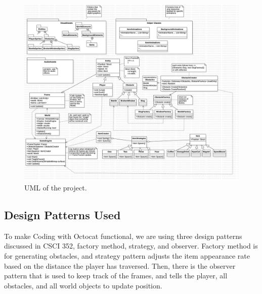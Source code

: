 \documentclass[10pt,conference,onecolumn,compsoc]{IEEEtran}
\begin{document}
\clearpage

\begin{figure}[!ht]
\includegraphics[scale=.18]{UML.jpg}
\caption{UML of the project.}
\end{figure}

\subsection{Design Patterns Used}
To make Coding with Octocat functional, we are using three design patterns discussed in CSCI 352, factory method, strategy, and observer. Factory method is for generating obstacles, and strategy pattern adjusts the item appearance rate based on the distance the player has traversed. Then, there is the observer pattern that is used to keep track of the frames, and tells the player, all obstacles, and all world objects to update position.

\end{document}
